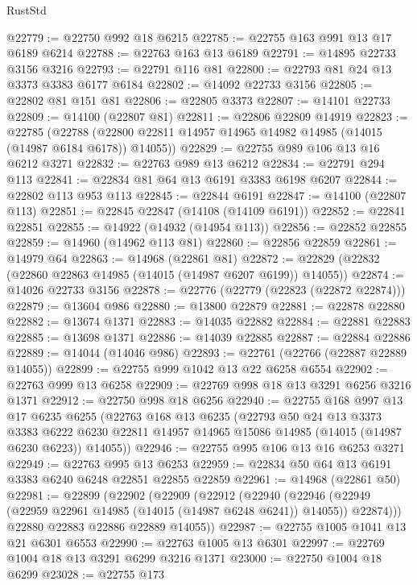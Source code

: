 \begin{lexlean}{RustStd}
\begin{coremodule}
@22779 := @22750 @992 @18 @6215
@22785 := @22755 @163 @991 @13 @17 @6189 @6214
@22788 := @22763 @163 @13 @6189
@22791 := @14895 @22733 @3156 @3216
@22793 := @22791 @116 @81
@22800 := @22793 @81 @24 @13 @3373 @3383 @6177 @6184
@22802 := @14092 @22733 @3156
@22805 := @22802 @81 @151 @81
@22806 := @22805 @3373
@22807 := @14101 @22733
@22809 := @14100 (@22807 @81)
@22811 := @22806 @22809 @14919
@22823 := @22785
    (@22788 (@22800 @22811 @14957 @14965 @14982 @14985 (@14015 (@14987 @6184 @6178)) @14055))
@22829 := @22755 @989 @106 @13 @16 @6212 @3271
@22832 := @22763 @989 @13 @6212
@22834 := @22791 @294 @113
@22841 := @22834 @81 @64 @13 @6191 @3383 @6198 @6207
@22844 := @22802 @113 @953 @113
@22845 := @22844 @6191
@22847 := @14100 (@22807 @113)
@22851 := @22845 @22847 (@14108 (@14109 @6191))
@22852 := @22841 @22851
@22855 := @14922 (@14932 (@14954 @113))
@22856 := @22852 @22855
@22859 := @14960 (@14962 @113 @81)
@22860 := @22856 @22859
@22861 := @14979 @64
@22863 := @14968 (@22861 @81)
@22872 := @22829 (@22832 (@22860 @22863 @14985 (@14015 (@14987 @6207 @6199)) @14055))
@22874 := @14026 @22733 @3156
@22878 := @22776 (@22779 (@22823 (@22872 @22874)))
@22879 := @13604 @986
@22880 := @13800 @22879
@22881 := @22878 @22880
@22882 := @13674 @1371
@22883 := @14035 @22882
@22884 := @22881 @22883
@22885 := @13698 @1371
@22886 := @14039 @22885
@22887 := @22884 @22886
@22889 := @14044 (@14046 @986)
@22893 := @22761 (@22766 (@22887 @22889 @14055))
@22899 := @22755 @999 @1042 @13 @22 @6258 @6554
@22902 := @22763 @999 @13 @6258
@22909 := @22769 @998 @18 @13 @3291 @6256 @3216 @1371
@22912 := @22750 @998 @18 @6256
@22940 := @22755
    @168
    @997
    @13
    @17
    @6235
    @6255
    (@22763
      @168
      @13
      @6235
      (@22793
        @50
        @24
        @13
        @3373
        @3383
        @6222
        @6230
        @22811
        @14957
        @14965
        @15086
        @14985
        (@14015 (@14987 @6230 @6223))
        @14055))
@22946 := @22755 @995 @106 @13 @16 @6253 @3271
@22949 := @22763 @995 @13 @6253
@22959 := @22834 @50 @64 @13 @6191 @3383 @6240 @6248 @22851 @22855 @22859
@22961 := @14968 (@22861 @50)
@22981 := @22899
    (@22902
      (@22909
        (@22912
          (@22940
            (@22946 (@22949 (@22959 @22961 @14985 (@14015 (@14987 @6248 @6241)) @14055)) @22874)))
        @22880
        @22883
        @22886
        @22889
        @14055))
@22987 := @22755 @1005 @1041 @13 @21 @6301 @6553
@22990 := @22763 @1005 @13 @6301
@22997 := @22769 @1004 @18 @13 @3291 @6299 @3216 @1371
@23000 := @22750 @1004 @18 @6299
@23028 := @22755
    @173

\end{coremodule}
\end{lexlean}

